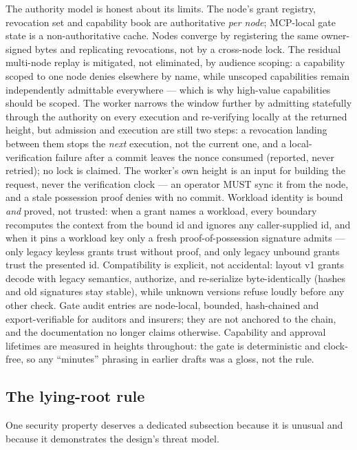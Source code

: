 \documentclass{article}
\begin{document}
The authority model is honest about its limits. The node's grant registry,
revocation set and capability book are authoritative \emph{per node}; MCP-local
gate state is a non-authoritative cache. Nodes converge by registering the
same owner-signed bytes and replicating revocations, not by a cross-node
lock. The residual multi-node replay is mitigated, not eliminated, by
audience scoping: a capability scoped to one node denies elsewhere by name,
while unscoped capabilities remain independently admittable everywhere ---
which is why high-value capabilities should be scoped. The worker narrows the
window further by admitting statefully through the authority on every
execution and re-verifying locally at the returned height, but admission and
execution are still two steps: a revocation landing between them stops the
\emph{next} execution, not the current one, and a local-verification failure
after a commit leaves the nonce consumed (reported, never retried); no lock
is claimed. The worker's own height is an input for building the request,
never the verification clock --- an operator MUST sync it from the node, and
a stale possession proof denies with no commit. Workload identity is
bound \emph{and} proved, not trusted: when a grant names a workload, every
boundary recomputes the context from the bound id and ignores any
caller-supplied id, and when it pins a workload key only a fresh
proof-of-possession signature admits --- only legacy keyless grants trust
without proof, and only legacy unbound grants trust the presented id.
Compatibility is explicit, not accidental: layout v1 grants decode with
legacy semantics, authorize, and re-serialize byte-identically (hashes and
old signatures stay stable), while unknown versions refuse loudly before any
other check. Gate audit entries are node-local, bounded, hash-chained and
export-verifiable for auditors and insurers; they are not anchored to the
chain, and the documentation no longer claims otherwise. Capability and
approval lifetimes are measured in heights throughout: the gate is
deterministic and clock-free, so any ``minutes'' phrasing in earlier drafts
was a gloss, not the rule.

\subsection{The lying-root rule}
\label{sec:lyingroot}

One security property deserves a dedicated subsection because it is unusual and
because it demonstrates the design's threat model.
\end{document}
